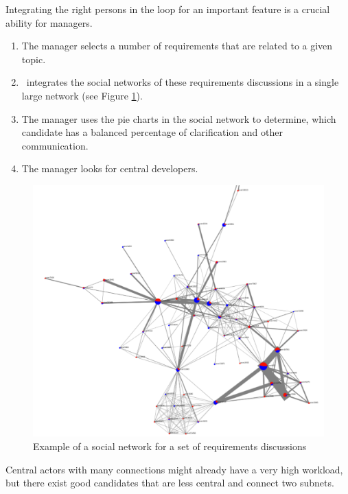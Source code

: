 Integrating the right persons in the loop for an important feature is a crucial ability for managers.
\begin{enumerate}
\item The manager selects a number of requirements that are related to a given topic. 
\item \viss\ integrates the social networks of these requirements discussions in a single large network (see Figure \ref{fig:example-sn-large}).
\item The manager uses the pie charts in the social network to determine, which candidate has a balanced percentage of clarification and other communication.
\item The manager looks for central developers. 
\end{enumerate}
\begin{figure}
\includegraphics[width=\columnwidth]{img/example-sn-large}
\caption{Example of a social network for a set of requirements discussions}
\label{fig:example-sn-large}
\end{figure}
Central actors with many connections might already have a very high workload, but there exist good candidates that are less central and connect two subnets.
